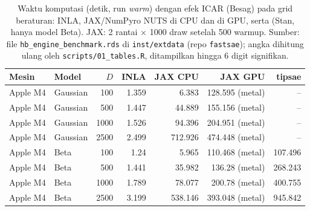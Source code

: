\begin{table}[htbp]
\centering
\caption{Waktu komputasi (detik, run \emph{warm})  dengan efek ICAR (Besag) pada grid beraturan: INLA, JAX/NumPyro NUTS di CPU dan di GPU, serta  (Stan, hanya model Beta). JAX: 2 rantai $\times$ 1000 draw setelah 500 warmup. Sumber: file \texttt{hb\_engine\_benchmark.rds} di \texttt{inst/extdata} (repo \texttt{fastsae}); angka dihitung ulang oleh \texttt{scripts/01\_tables.R}, ditampilkan hingga 6 digit signifikan.}
\label{tab:engine-time}
\small
\begin{tabular}{llrrrrr}
\toprule
Mesin & Model & $D$ & INLA & JAX CPU & JAX GPU & tipsae \\
\midrule
Apple M4 & Gaussian & 100 &   1.359 &   6.383 & 128.595 (metal) & -- \\
Apple M4 & Gaussian & 500 &   1.447 &  44.889 & 155.156 (metal) & -- \\
Apple M4 & Gaussian & 1000 &   1.526 &  94.396 & 204.951 (metal) & -- \\
Apple M4 & Gaussian & 2500 &   2.499 & 712.926 & 474.448 (metal) & -- \\
Apple M4 & Beta & 100 &    1.24 &   5.965 & 110.468 (metal) & 107.496 \\
Apple M4 & Beta & 500 &   1.441 &  35.982 &  136.28 (metal) & 268.243 \\
Apple M4 & Beta & 1000 &   1.789 &  78.077 &  200.78 (metal) & 400.755 \\
Apple M4 & Beta & 2500 &   3.199 & 538.146 & 393.048 (metal) & 945.842 \\
\bottomrule
\end{tabular}
\end{table}

